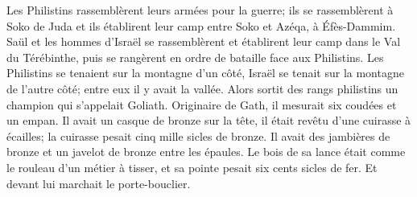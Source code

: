 Les Philistins rassemblèrent leurs armées pour la guerre;
	ils se rassemblèrent à Soko de Juda
	et ils établirent leur camp entre Soko et Azéqa, à Éfès-Dammim.
Saül et les hommes d’Israël se rassemblèrent
	et établirent leur camp dans le Val du Térébinthe,
	puis se rangèrent en ordre de bataille face aux Philistins.
Les Philistins se tenaient sur la montagne d’un côté,
	Israël se tenait sur la montagne de l’autre côté;
	entre eux il y avait la vallée.
Alors sortit des rangs philistins un champion qui s’appelait Goliath.
	Originaire de Gath, il mesurait six coudées et un empan.
Il avait un casque de bronze sur la tête, il était revêtu d’une cuirasse à écailles;
	la cuirasse pesait cinq mille sicles de bronze.
Il avait des jambières de bronze et un javelot de bronze entre les épaules.
Le bois de sa lance était comme le rouleau d’un métier à tisser,
	et sa pointe pesait six cents sicles de fer.
	Et devant lui marchait le porte-bouclier.
